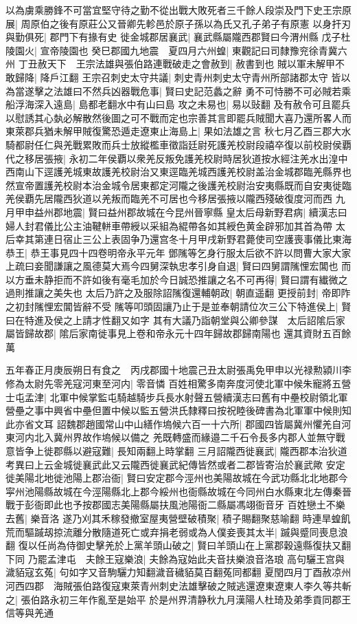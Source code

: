 以為虜乘勝鋒不可當宜堅守待之勤不從出戰大敗死者三千餘人段崇及門下史王宗原展|{
	周原伯之後有原莊公又晉卿先軫邑於原子孫以為氏又孔子弟子有原憲}
以身扞刃與勤俱死|{
	郡門下有掾有史}
徙金城郡居襄武|{
	襄武縣屬隴西郡賢曰今渭州縣}
戊子杜陵園火|{
	宣帝陵園也}
癸巳郡國九地震　夏四月六州蝗|{
	東觀記曰司隸豫兖徐青冀六州}
丁丑赦天下　王宗法雄與張伯路連戰破走之會赦到|{
	赦書到也}
賊以軍未解甲不敢歸降|{
	降戶江翻}
王宗召刺史太守共議|{
	刺史青州刺史太守青州所部諸郡太守}
皆以為當遂擊之法雄曰不然兵凶器戰危事|{
	賢曰史記范蠡之辭}
勇不可恃勝不可必賊若乘船浮海深入遠島|{
	島都老翻水中有山曰島}
攻之未易也|{
	易以䜴翻}
及有赦令可且罷兵以慰誘其心埶必解散然後圖之可不戰而定也宗善其言即罷兵賊聞大喜乃還所畧人而東萊郡兵猶未解甲賊復驚恐遁走遼東止海島上|{
	果如法雄之言}
秋七月乙酉三郡大水騎都尉任仁與羌戰累敗而兵士放縱檻車徵詣廷尉死護羌校尉段禧卒復以前校尉侯覇代之移居張掖|{
	永初二年侯覇以衆羌反叛免護羌校尉時居狄道按水經注羌水出湟中西南山下逕護羌城東故護羌校尉治又東逕臨羌城西護羌校尉盖治金城郡臨羌縣界也然宣帝置護羌校尉本治金城令居東都定河隴之後護羌校尉治安夷縣既而自安夷徙臨羌侯覇先居隴西狄道以羌叛而臨羌不可居也今移居張掖以隴西殘破復度河而西}
九月甲申益州郡地震|{
	賢曰益州郡故城在今昆州晉寧縣}
皇太后母新野君病|{
	續漢志曰婦人封君儀比公主油鞬軿車帶綬以采組為緄帶各如其綬色黄金辟邪加其首為帶}
太后幸其第連日宿止三公上表固争乃還宫冬十月甲戌新野君薨使司空護喪事儀比東海恭王|{
	恭王事見四十四卷明帝永平元年}
鄧隲等乞身行服太后欲不許以問曹大家大家上疏曰妾聞謙讓之風德莫大焉今四舅深執忠孝引身自退|{
	賢曰四舅謂隲悝宏閶也}
而以方垂未静拒而不許如後有毫毛加於今日誠恐推讓之名不可再得|{
	賢曰謂有纎微之過則推讓之美失也}
太后乃許之及服除詔隲復還輔朝政|{
	朝直遥翻}
更授前封|{
	帝即阼之初封隲悝宏閶皆辭不受}
隲等叩頭固讓乃止于是並奉朝請位次三公下特進侯上|{
	賢曰在特進及侯之上請才性翻又如字}
其有大議乃詣朝堂與公卿參謀　太后詔隂后家屬皆歸故郡|{
	隂后家南徙事見上卷和帝永元十四年歸故郡歸南陽也}
還其資財五百餘萬

五年春正月庚辰朔日有食之　丙戌郡國十地震己丑太尉張禹免甲申以光禄勲潁川李修為太尉先零羌寇河東至河内|{
	零音憐}
百姓相驚多南奔度河使北軍中候朱寵將五營士屯孟津|{
	北軍中候掌監屯騎越騎步兵長水射聲五營續漢志曰舊有中壘校尉領北軍營壘之事中興省中壘但置中候以監五營洪氏隸釋曰按祝睦後碑書為北軍軍中候則知此亦省文耳}
詔魏郡趙國常山中山繕作塢候六百一十六所|{
	郡國四皆屬冀州懼羌自河東河内北入冀州界故作塢候以備之}
羌既轉盛而緣邉二千石令長多内郡人並無守戰意皆争上徙郡縣以避寇難|{
	長知兩翻上時掌翻}
三月詔隴西徙襄武|{
	隴西郡本治狄道　考異曰上云金城徙襄武此又云隴西徙襄武紀傳皆然或者二郡皆寄治於襄武歟}
安定徙美陽北地徙池陽上郡治衙|{
	賢曰安定郡今涇州也美陽故城在今武功縣北北地郡今寜州池陽縣故城在今涇陽縣北上郡今綏州也衙縣故城在今同州白水縣東北左傳秦晉戰于彭衙即此也予按郡國志美陽縣屬扶風池陽衙二縣屬馮翊衙音牙}
百姓戀土不樂去舊|{
	樂音洛}
遂乃刈其禾稼發撤室屋夷營壁破積聚|{
	積子賜翻聚慈喻翻}
時連旱蝗飢荒而驅䠞刼掠流離分散隨道死亡或弃捐老弱或為人僕妾喪其太半|{
	䠞與蹙同喪息浪翻}
復以任尚為侍御史擊羌於上黨羊頭山破之|{
	賢曰羊頭山在上黨郡穀遠縣復扶又翻下同}
乃罷孟津屯　夫餘王寇樂浪|{
	夫餘為寇始此夫音扶樂浪音洛琅}
高句驪王宫與濊貊寇玄菟|{
	句如字又音駒驪力知翻濊音穢貊莫百翻菟同都翻}
夏閏四月丁酉赦凉州河西四郡　海賊張伯路復寇東萊青州刺史法雄擊破之賊逃還遼東遼東人李久等共斬之|{
	張伯路永初三年作亂至是始平}
於是州界清静秋九月漢陽人杜琦及弟季貢同郡王信等與羌通

